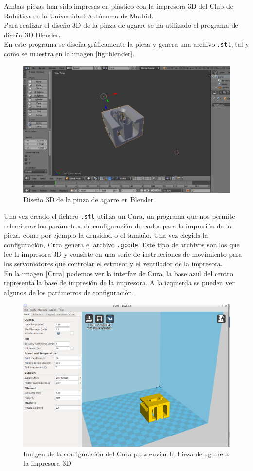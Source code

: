 \documentclass[twoside, 11pt]{epstfg}
\begin{document}
Ambas piezas han sido impresas en plástico con la impresora 3D del Club de Robótica de la Universidad Autónoma de Madrid.\\
Para realizar el diseño 3D de la pinza de agarre se ha utilizado el programa de diseño 3D Blender.\\
En este programa se diseña gráficamente la pieza y genera una archivo \texttt{.stl}, tal y como se muestra en la imagen \ref{fig::blender}. 
\begin{figure}[H]
	\centerline{
		\mbox{\includegraphics[width=.80\textwidth]{images/cameraBlender.png}}
	}
	\caption{ Diseño 3D de la pinza de agarre en Blender}
\end{figure}\label{fig::blender}

Una vez creado el fichero \texttt{.stl} utiliza un Cura, un programa que nos permite seleccionar los parámetros de configuración deseados para la impresión de la pieza, como por ejemplo la densidad o el tamaño. Una vez elegida la configuración, Cura genera el archivo \texttt{.gcode}. Este tipo de archivos son los que lee la impresora 3D y consiste en una serie de instrucciones de movimiento para los servomotores que controlar el estrusor y el ventilador de la impresora.\\
En la imagen \ref{Cura} podemos ver la interfaz de Cura, la base azul del centro representa la base de impresión de la impresora. A la izquierda se pueden ver algunos de los parámetros de configuración.

\begin{figure}[H]
	\centerline{
		\mbox{\includegraphics[width=.75\textwidth]{images/Cura2.png}}
	}
	\caption{Imagen de la configuración del Cura para enviar la Pieza de agarre a la impresora 3D}
\end{figure}\label{Cura}
 
\end{document}
